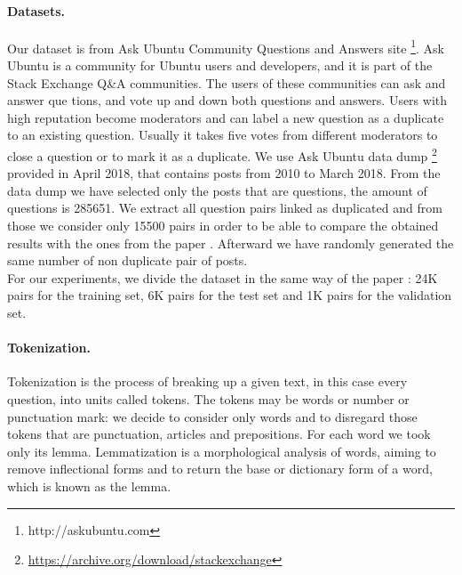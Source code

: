 \documentclass[10pt,twocolumn,letterpaper]{article}
\begin{document}
\paragraph{Datasets.}
Our dataset is from Ask Ubuntu Community Questions and Answers site \footnote{http://askubuntu.com}. Ask Ubuntu is a community for Ubuntu users and developers, and it is part of the Stack Exchange Q\&A communities. The users of these communities can ask and answer que tions, and vote up and down both questions and answers. Users with high reputation become moderators and can label a new question as a duplicate to an existing question. Usually it takes five votes from different moderators to close a question or to mark it as a duplicate. 
We use Ask Ubuntu data dump \footnote{ \url{https://archive.org/download/stackexchange}} provided in April 2018, that contains posts from 2010 to March 2018. From the data dump we have selected only the posts that are questions, the amount of questions is 285651. We extract all question pairs linked as duplicated and from those we consider only 15500 pairs in order to be able to compare the obtained results with the ones from the paper \cite{bogdanova2015detecting}. Afterward we have randomly generated the same number of non duplicate pair of posts. \\
For our experiments, we divide the dataset in the same way of the paper \cite{bogdanova2015detecting}: 24K pairs for the training set, 6K pairs for the test set and 1K pairs for the validation set.

\paragraph{Tokenization.}
Tokenization is the process of breaking up a given text, in this case every question, into units called tokens. The tokens may be words or number or punctuation mark: we decide to consider only words and to disregard those tokens that are punctuation, articles and prepositions.
For each word we took only its lemma. Lemmatization is a morphological analysis of words, aiming to remove inflectional forms and to return the base or dictionary form of a word, which is known as the lemma.
\end{document}
